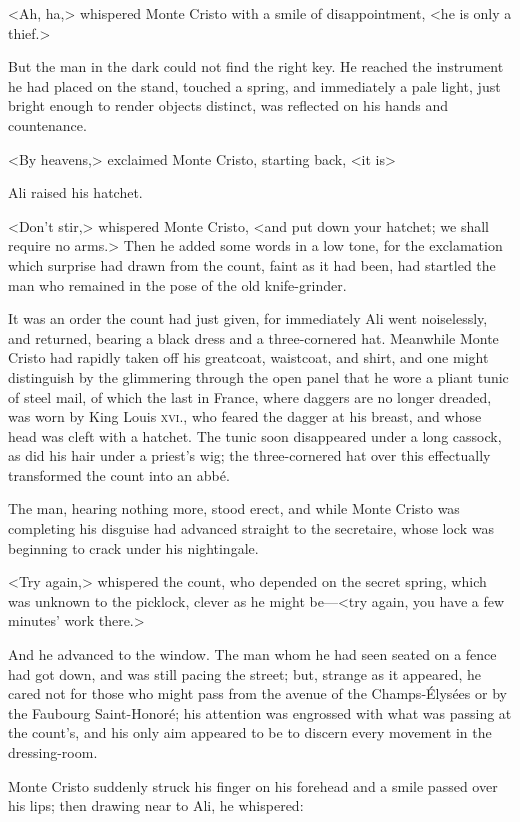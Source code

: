  <Ah, ha,> whispered Monte Cristo with a smile of disappointment, <he is only a thief.> 

 But the man in the dark could not find the right key. He reached the instrument he had placed on the stand, touched a spring, and immediately a pale light, just bright enough to render objects distinct, was reflected on his hands and countenance. 

 <By heavens,> exclaimed Monte Cristo, starting back, <it is\longdash> 

 Ali raised his hatchet. 

 <Don't stir,> whispered Monte Cristo, <and put down your hatchet; we shall require no arms.>  Then he added some words in a low tone, for the exclamation which surprise had drawn from the count, faint as it had been, had startled the man who remained in the pose of the old knife-grinder. 

 It was an order the count had just given, for immediately Ali went noiselessly, and returned, bearing a black dress and a three-cornered hat. Meanwhile Monte Cristo had rapidly taken off his greatcoat, waistcoat, and shirt, and one might distinguish by the glimmering through the open panel that he wore a pliant tunic of steel mail, of which the last in France, where daggers are no longer dreaded, was worn by King Louis \textsc{xvi.}, who feared the dagger at his breast, and whose head was cleft with a hatchet. The tunic soon disappeared under a long cassock, as did his hair under a priest's wig; the three-cornered hat over this effectually transformed the count into an abbé. 

 The man, hearing nothing more, stood erect, and while Monte Cristo was completing his disguise had advanced straight to the secretaire, whose lock was beginning to crack under his nightingale. 

 <Try again,> whispered the count, who depended on the secret spring, which was unknown to the picklock, clever as he might be—<try again, you have a few minutes' work there.> 

 And he advanced to the window. The man whom he had seen seated on a fence had got down, and was still pacing the street; but, strange as it appeared, he cared not for those who might pass from the avenue of the Champs-Élysées or by the Faubourg Saint-Honoré; his attention was engrossed with what was passing at the count's, and his only aim appeared to be to discern every movement in the dressing-room. 

 Monte Cristo suddenly struck his finger on his forehead and a smile passed over his lips; then drawing near to Ali, he whispered: 

